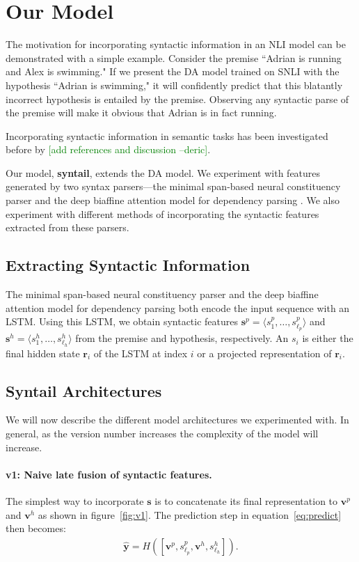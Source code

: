 \documentclass[11pt,a4paper]{article}
\newcommand{\dpcomment}[1]{\textcolor{green}{[#1 --deric]}}
\begin{document}
\section{Our Model}

The motivation for incorporating syntactic information in an NLI model
can be demonstrated with a simple example. Consider the premise ``Adrian is running
and Alex is swimming." If we present the DA model trained on SNLI with the
hypothesis ``Adrian is swimming," it will confidently predict that this
blatantly incorrect hypothesis is entailed by the premise. Observing
any syntactic parse of
the premise will make it obvious that Adrian is in fact running.

Incorporating syntactic information in semantic tasks has been investigated
before by \dpcomment{add references and discussion}.

Our model, \textbf{syntail}, extends the DA model.
We experiment with features generated by two syntax parsers---the
minimal span-based neural constituency parser \citep{Stern2017-co} and
the deep biaffine attention model for dependency parsing \citep{Dozat2016-gs}. We also experiment
with different methods of incorporating the syntactic features extracted
from these parsers.

\subsection{Extracting Syntactic Information}

The minimal span-based neural constituency parser and the deep biaffine attention
model for dependency parsing both encode the input sequence with an LSTM. Using
this LSTM, we obtain
syntactic features $\bm{s}^p = \langle s^p_1, \dots, s^p_{\ell_p} \rangle$ and
$\bm{s}^h = \langle s^h_1, \dots, s^h_{\ell_h} \rangle$ from the premise and hypothesis,
respectively. An $s_i$ is either
the final hidden state $\bm{r}_i$ of the LSTM at index $i$ or a projected
representation of $\bm{r}_i$.

\subsection{Syntail Architectures}

We will now describe the different model architectures we experimented with.
In general, as the version number increases the complexity of the model will increase.

\paragraph{v1: Naive late fusion of syntactic features.}
The simplest way to incorporate $\bm{s}$ is to concatenate its final representation to
$\bm{v}^p$ and $\bm{v}^h$ as shown in figure~\ref{fig:v1}.
The prediction step in equation~\ref{eq:predict} then becomes:
\begin{align}
    \hat{\bm{y}} = H([\bm{v}^p, s^p_{\ell_p}, \bm{v}^h, s^h_{\ell_h}]).
\end{align}
\end{document}
